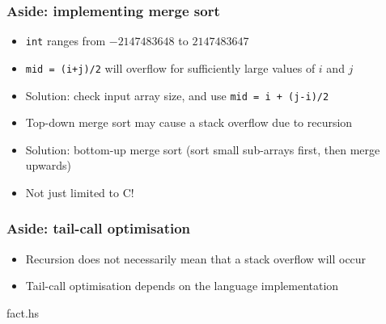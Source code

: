 \documentclass{beamer}
\begin{document}
\begin{frame}
 \frametitle{Aside: implementing merge sort}
 \begin{itemize}
  \item \texttt{int} ranges from $-2147483648$ to $2147483647$
  \item \texttt{mid = (i+j)/2} will overflow for sufficiently large
        values of $i$ and $j$
  \item Solution: check input array size, and use
        \texttt{mid = i + (j-i)/2}
  \item Top-down merge sort may cause a stack overflow due to recursion
  \item Solution: bottom-up merge sort (sort small sub-arrays first,
        then merge upwards)
  \item Not just limited to C!
 \end{itemize}
\end{frame}

\begin{frame}[fragile]
 \frametitle{Aside: tail-call optimisation}
 \begin{itemize}
  \item Recursion does not necessarily mean that a stack overflow will
        occur
  \item Tail-call optimisation depends on the language implementation
 \end{itemize}
 \begin{lstinputlisting}[language=Haskell, firstline=3, lastline=14]{fact.hs}
 \end{lstinputlisting}
\end{frame}
\end{document}

